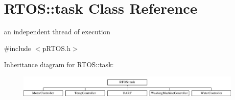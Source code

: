 \hypertarget{class_r_t_o_s_1_1task}{}\section{R\+T\+OS\+:\+:task Class Reference}
\label{class_r_t_o_s_1_1task}


an independent thread of execution  




{\ttfamily \#include $<$p\+R\+T\+O\+S.\+h$>$}

Inheritance diagram for R\+T\+OS\+:\+:task\+:\begin{figure}[H]
\begin{center}
\leavevmode
\includegraphics[height=1.078998cm]{class_r_t_o_s_1_1task}
\end{center}
\end{figure}
